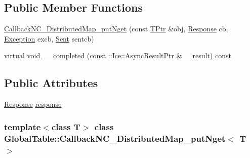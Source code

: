 \subsection*{Public Member Functions}
\begin{DoxyCompactItemize}
\item 
\hyperlink{class_global_table_1_1_callback_n_c___distributed_map__put_nget_a36edb31c5388530d311c78e46e60bbd3}{CallbackNC\_\-DistributedMap\_\-putNget} (const \hyperlink{class_global_table_1_1_callback_n_c___distributed_map__put_nget_af10659383ce85f40612aa261f2b226db}{TPtr} \&obj, \hyperlink{class_global_table_1_1_callback_n_c___distributed_map__put_nget_add8ea77c4ddeceea21ef6446f089e8a5}{Response} cb, \hyperlink{class_global_table_1_1_callback_n_c___distributed_map__put_nget_a980c60b282bce6f892681856c3bf80f9}{Exception} excb, \hyperlink{class_global_table_1_1_callback_n_c___distributed_map__put_nget_ab35fdf71fb5a996677b4a7c079a00f6f}{Sent} sentcb)
\item 
virtual void \hyperlink{class_global_table_1_1_callback_n_c___distributed_map__put_nget_aa2007f9896e573ab1a48c764719a7a42}{\_\-\_\-completed} (const ::Ice::AsyncResultPtr \&\_\-\_\-result) const 
\end{DoxyCompactItemize}
\subsection*{Public Attributes}
\begin{DoxyCompactItemize}
\item 
\hyperlink{class_global_table_1_1_callback_n_c___distributed_map__put_nget_add8ea77c4ddeceea21ef6446f089e8a5}{Response} \hyperlink{class_global_table_1_1_callback_n_c___distributed_map__put_nget_ae94b50eca5cc3f931b57518ff0e277d9}{response}
\end{DoxyCompactItemize}
\subsubsection*{template$<$class T$>$ class GlobalTable::CallbackNC\_\-DistributedMap\_\-putNget$<$ T $>$}



